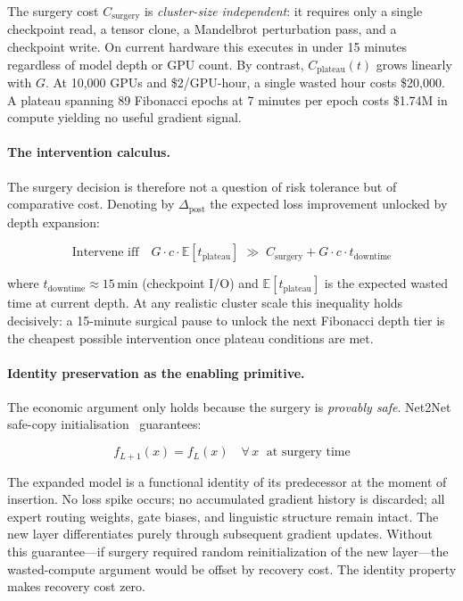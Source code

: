 \documentclass[11pt,a4paper]{article}
\begin{document}
The surgery cost $C_{\text{surgery}}$ is \emph{cluster-size independent}: it
requires only a single checkpoint read, a tensor clone, a Mandelbrot
perturbation pass, and a checkpoint write. On current hardware this executes in
under 15 minutes regardless of model depth or GPU count. By contrast,
$C_{\text{plateau}}(t)$ grows linearly with $G$. At 10{,}000 GPUs and
\$2/GPU-hour, a single wasted hour costs \$20{,}000. A plateau spanning 89
Fibonacci epochs at 7 minutes per epoch costs \$1.74M in compute yielding no
useful gradient signal.

\paragraph{The intervention calculus.}
The surgery decision is therefore not a question of risk tolerance but of
comparative cost. Denoting by $\Delta_{\text{post}}$ the expected loss
improvement unlocked by depth expansion:

\begin{equation}
  \text{Intervene iff} \quad
  G \cdot c \cdot \mathbb{E}[t_{\text{plateau}}] \;\gg\; C_{\text{surgery}} + G \cdot c \cdot t_{\text{downtime}}
\end{equation}

where $t_{\text{downtime}} \approx 15\,\text{min}$ (checkpoint I/O) and
$\mathbb{E}[t_{\text{plateau}}]$ is the expected wasted time at current depth.
At any realistic cluster scale this inequality holds decisively: a 15-minute
surgical pause to unlock the next Fibonacci depth tier is the cheapest possible
intervention once plateau conditions are met.

\paragraph{Identity preservation as the enabling primitive.}
The economic argument only holds because the surgery is \emph{provably safe}.
Net2Net safe-copy initialisation~\cite{chen2016net2net} guarantees:

\begin{equation}
  f_{L+1}(x) = f_L(x) \quad \forall\, x \;\text{ at surgery time}
\end{equation}

The expanded model is a functional identity of its predecessor at the moment of
insertion. No loss spike occurs; no accumulated gradient history is discarded;
all expert routing weights, gate biases, and linguistic structure remain intact.
The new layer differentiates purely through subsequent gradient updates. Without
this guarantee---if surgery required random reinitialization of the new
layer---the wasted-compute argument would be offset by recovery cost. The
identity property makes recovery cost zero.
\end{document}
